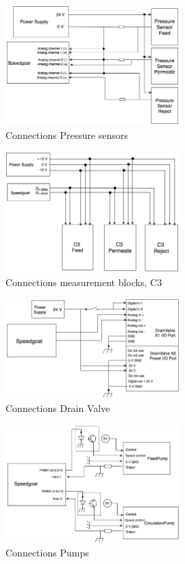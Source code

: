 \begin{figure}[H]
    \centering
    \includegraphics[width=0.6\textwidth]{PressConn}
    \caption{Connections Pressure sensors}
    \label{fig:PressConn}
\end{figure}
\begin{figure}[H]
    \centering
    \includegraphics[width=0.6\textwidth]{C3Conn}
    \caption{Connections measurement blocks, C3}
    \label{fig:C3Conn}
\end{figure}
\begin{figure}[H]
    \centering
    \includegraphics[width=0.6\textwidth]{ValveConn}
    \caption{Connections Drain Valve}
    \label{fig:ValveConn}
\end{figure}
\begin{figure}[H]
    \centering
    \includegraphics[width=0.6\textwidth]{PumpConn}
    \caption{Connections Pumps}
    \label{fig:PumpConn}
\end{figure}
